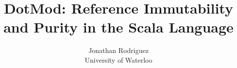 \documentclass[11pt]{report}
\newcommand{\cdf}{\bf\ttfamily} %
\newcommand{\cd}{\cdf\small}  %
\begin{document}
\title{DotMod: Reference Immutability and Purity in the Scala Language}
\author{Jonathan Rodriguez\\University of Waterloo}
\maketitle

\begin{comment}
\chapter{Introduction}

\chapter{Introduction to Reference Immutability}

Reference immutability is a mechanism for helping prevent unintentional modification of shared-memory state in object-oriented programs.

The C++ language included the {\cd const} keyword, which served as in-code documentation that certain objects and fields would not be modified. The {\cd const}-correctness of programs is checked by standards-compliant C++ compilers, which issue errors where {\cd const} state is mutated or where {\cd const} is dropped without an explicit casting operation.

Java has no exact equivalent of {\cd const}. Fields and objects in Java may be declared {\cd final}, which serves one of the purposes of {\cd const} in C++. However, {\cd const} in C++ may be used in a different sense: in C++, it is possible to declare that a pointer or reference refers to a {\cd const} object. The result of following such a pointer or reference is an object that should be treated as if it was declared {\cd const}.

A related problem in standard Java is that there is no built-in language mechanism for differentiating between owned objects and non-owned objects. An ownership relationship expresses that one object is ``part of'' another object, a relationship that C++ is able to express directly through the mechanism of type composition.  Ownership expresses a has-a relationship, and C++ is able to express ownership through type composition, where one object is quite literally part of another object. A {\cd const} object in C++ 
\end{comment}
\end{document}
